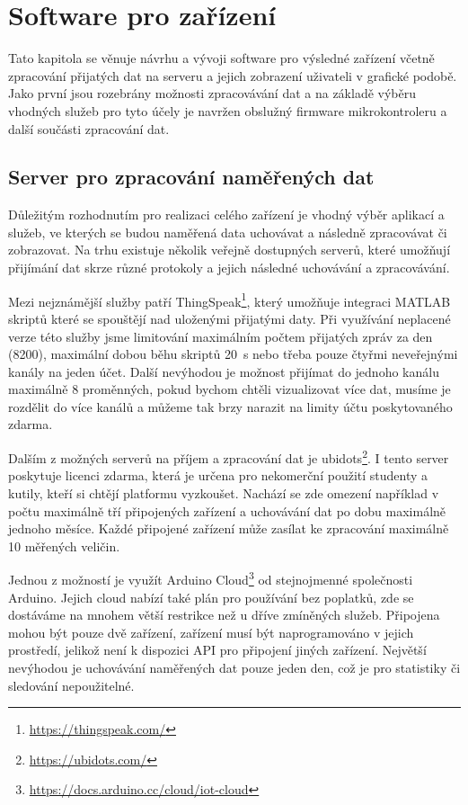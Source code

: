 \chapter{Software pro zařízení}

Tato kapitola se věnuje návrhu a vývoji software pro výsledné zařízení včetně zpracování přijatých dat na serveru a jejich zobrazení uživateli v grafické podobě. Jako první jsou rozebrány možnosti zpracovávání dat a na základě výběru vhodných služeb pro tyto účely je navržen obslužný firmware mikrokontroleru a další součásti zpracování dat.

\section{Server pro zpracování naměřených dat}

Důležitým rozhodnutím pro realizaci celého zařízení je vhodný výběr aplikací a služeb, ve kterých se budou naměřená data uchovávat a následně zpracovávat či zobrazovat. Na trhu existuje několik veřejně dostupných serverů, které umožňují přijímání dat skrze různé protokoly a jejich následné uchovávání a zpracovávání.

Mezi nejznámější služby patří ThingSpeak\footnote{\url{https://thingspeak.com/}}, který umožňuje integraci MATLAB skriptů které se spouštějí nad uloženými přijatými daty. Při využívání neplacené verze této služby jsme limitování maximálním počtem přijatých zpráv za den (\SI{8200}{}), maximální dobou běhu skriptů \SI{20}{\second} nebo třeba pouze čtyřmi neveřejnými kanály na jeden účet. Další nevýhodou je možnost přijímat do jednoho kanálu maximálně 8 proměnných, pokud bychom chtěli vizualizovat více dat, musíme je rozdělit do více kanálů a můžeme tak brzy narazit na limity účtu poskytovaného zdarma.

Dalším z možných serverů na příjem a zpracování dat je ubidots\footnote{\url{https://ubidots.com/}}. I tento server poskytuje licenci zdarma, která je určena pro nekomerční použití studenty a kutily, kteří si chtějí platformu vyzkoušet. Nachází se zde omezení například v počtu maximálně tří připojených zařízení a uchovávání dat po dobu maximálně jednoho měsíce. Každé připojené zařízení může zasílat ke zpracování maximálně \SI{10}{} měřených veličin.

Jednou z možností je využít Arduino Cloud\footnote{\url{https://docs.arduino.cc/cloud/iot-cloud}} od stejnojmenné společnosti Arduino. Jejich cloud nabízí také plán pro používání bez poplatků, zde se dostáváme na mnohem větší restrikce než u dříve zmíněných služeb. Připojena mohou být pouze dvě zařízení, zařízení musí být naprogramováno v jejich prostředí, jelikož není k dispozici API pro připojení jiných zařízení. Největší nevýhodou je uchovávání naměřených dat pouze jeden den, což je pro statistiky či sledování nepoužitelné.

